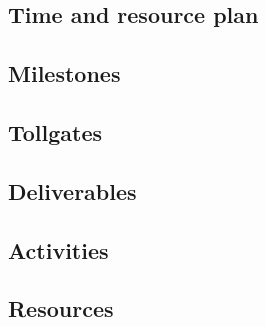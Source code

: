 
\subsection{Time and resource plan}
\subsection{Milestones}
\subsection{Tollgates}
\subsection{Deliverables}
\subsection{Activities}
\subsection{Resources}
